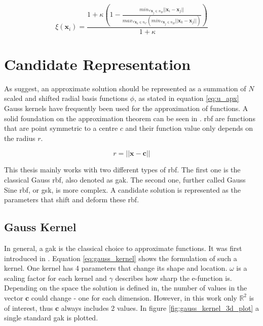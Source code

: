 \documentclass[./\jobname.tex]{subfiles}
\begin{document}
\begin{equation}
\label{eq:nc_weight}
\xi(\mathbf{x}_i) = \frac{1 + \kappa \left(1 - \frac{min_{\forall \mathbf{x}_j\in n_B}|| \mathbf{x}_i - \mathbf{x}_j ||}{max_{\forall\mathbf{x}_k \in n_C}(min_{\forall \mathbf{x}_j \in n_B} || \mathbf{x}_k - \mathbf{x}_j ||)}\right)}{1 + \kappa}
\end{equation}


\section{Candidate Representation}
\label{chap:candidate_rep}

As \cite{chaquet_using_2019} suggest, an approximate solution should be represented as a summation of $N$ scaled and shifted radial basis functions $\phi$, as stated in equation \eqref{eq:u_apx} Gauss kernels have frequently been used for the approximation of functions. A solid foundation on the approximation theorem can be seen in \cite{park_universal_1991}. \gls{rbf} are functions that are point symmetric to a centre $c$ and their function value only depends on the radius $r$. 

\begin{equation}
\label{eq: radius}
r = \left|\left|\mathbf{x} - \mathbf{c} \right|\right|
\end{equation}

This thesis mainly works with two different types of \gls{rbf}. The first one is the classical Gauss \gls{rbf}, also denoted as \gls{gak}. The second one, further called Gauss Sine \gls{rbf}, or \gls{gsk}, is more complex. A candidate solution is represented as the parameters that shift and deform these \gls{rbf}. 

\subsection{Gauss Kernel}
\label{chap:gauss_kernel}

In general, a \gls{gak} is the classical choice to approximate functions. It was first introduced in \cite{broomhead_multivariable_1988}. Equation \eqref{eq:gauss_kernel} shows the formulation of such a kernel. One kernel has 4 parameters that change its shape and location. $\omega$ is a scaling factor for each kernel and $\gamma$ describes how sharp the e-function is. Depending on the space the solution is defined in, the number of values in the vector $\mathbf{c}$ could change - one for each dimension. However, in this work only $\mathbb{R}^2$ is of interest, thus $\mathbf{c}$ always includes 2 values. In figure \ref{fig:gauss_kernel_3d_plot} a single standard \gls{gak} is plotted. 
\end{document}
